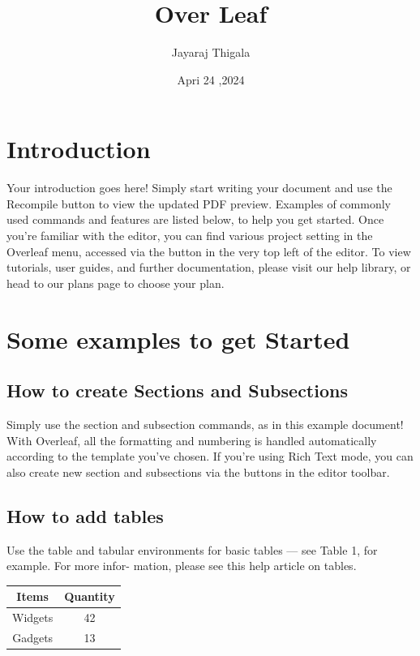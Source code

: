 \documentclass{article}
\begin{document}
	\title{Over Leaf}
	\author{Jayaraj Thigala}
	\date{Apri 24 ,2024}
	\maketitle
	
	\section{Introduction}
	Your introduction goes here! Simply start writing your document and use the Recompile button to
	view the updated PDF preview. Examples of commonly used commands and features are listed below,
	to help you get started.
	Once you’re familiar with the editor, you can find various project setting in the Overleaf menu,
	accessed via the button in the very top left of the editor. To view tutorials, user guides, and further
	documentation, please visit our help library, or head to our plans page to choose your plan.
	
	\section{Some examples to get Started}
	
	\subsection{ How to create Sections and Subsections }
	Simply use the section and subsection commands, as in this example document! With Overleaf, all
	the formatting and numbering is handled automatically according to the template you’ve chosen. If
	you’re using Rich Text mode, you can also create new section and subsections via the buttons in the
	editor toolbar.
	
	\subsection{How to add tables}
	Use the table and tabular environments for basic tables — see Table 1, for example. For more infor-
	mation, please see this help article on tables.
	
	\begin{table}[h]
		\centering
		\begin{tabular}{|c|c|}
			\hline
			Items & Quantity\\
			\hline
			Widgets & 42 \\
			Gadgets & 13 \\
			\hline
			
		\end{tabular}
	\end{table}
	
\end{document}
